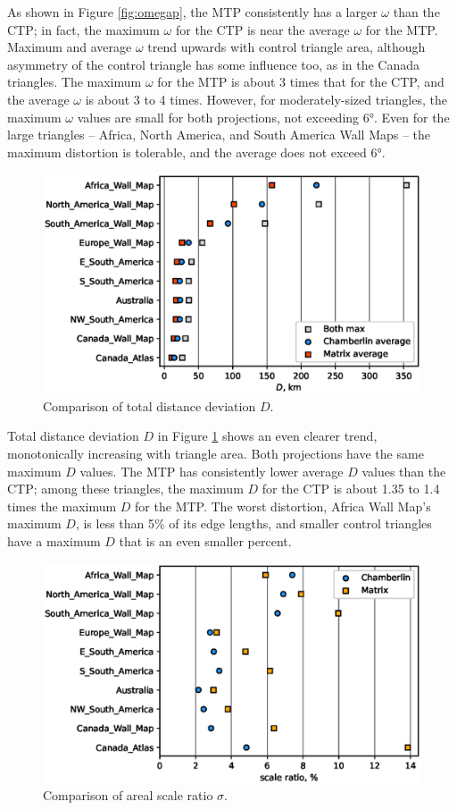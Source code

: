 \documentclass[]{interact}
\begin{document}
As shown in Figure \ref{fig:omegap}, the MTP consistently has a larger $\omega$
than the CTP; in fact, the maximum $\omega$ for the CTP is near the average
$\omega$ for the MTP. Maximum and average $\omega$ trend upwards with control
triangle area, although asymmetry of the control triangle has some influence
too, as in the Canada triangles. The maximum $\omega$ for the MTP is about 3
times that for the CTP, and the average $\omega$ is about 3 to 4 times.
However, for moderately-sized triangles,
the maximum $\omega$ values are small for both projections, not exceeding 6°.
Even for the large triangles -- Africa, North America, and South America Wall
Maps -- the maximum distortion is tolerable, and the average does not exceed 6°.

\begin{figure}
  \includegraphics[width=\textwidth]{distanceplot}
  \caption{Comparison of total distance deviation $D$.}
  \label{fig:distancep}
\end{figure}

Total distance deviation $D$ in Figure \ref{fig:distancep} shows an even clearer
trend, monotonically increasing with triangle area. Both projections have the
same maximum $D$ values. The MTP has consistently lower average $D$ values than
the CTP; among these triangles, the maximum $D$ for the CTP is about
1.35 to 1.4 times the maximum $D$ for the MTP. The worst distortion,
Africa Wall Map's maximum $D$, is less than 5\% of its edge lengths, and
smaller control triangles have a maximum $D$ that is an even smaller percent.

\begin{figure}
  \includegraphics[width=\textwidth]{scaleplot}
  \caption{Comparison of areal scale ratio $\sigma$.}
  \label{fig:scalep}
\end{figure}
\end{document}
